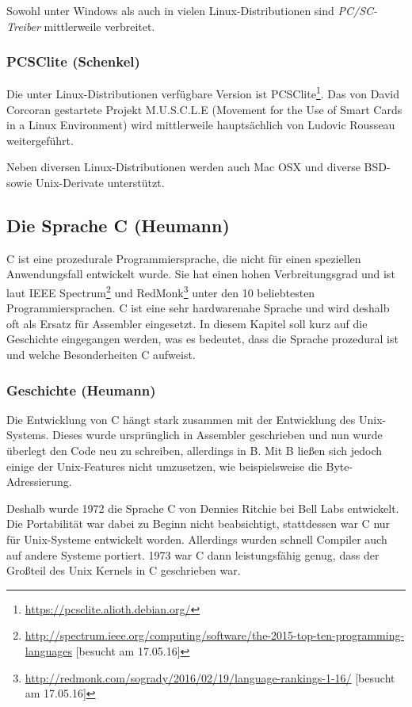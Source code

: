 Sowohl unter Windows als auch in vielen Linux-Distributionen sind
\textit{PC/SC-Treiber} mittlerweile verbreitet.

\subsubsection{PCSClite (Schenkel)}
Die unter Linux-Distributionen verfügbare Version ist
PCSClite\footnote{\url{https://pcsclite.alioth.debian.org/}}.
Das von David Corcoran gestartete Projekt M.U.S.C.L.E
(Movement for the Use of Smart Cards in a Linux Environment)
wird mittlerweile hauptsächlich von Ludovic Rousseau
weitergeführt\cite{pcscliteweb}.

Neben diversen Linux-Distributionen werden auch Mac OSX und diverse
BSD- sowie Unix-Derivate unterstützt.

\subsection{Die Sprache C (Heumann)}
 C ist eine prozedurale Programmiersprache, die nicht für einen speziellen
 Anwendungsfall entwickelt wurde. Sie hat einen hohen Verbreitungsgrad
 und ist laut \ac{IEEE} Spectrum\footnote{\url{http://spectrum.ieee.org/computing/software/the-2015-top-ten-programming-languages} [besucht am 17.05.16]}
 und RedMonk\footnote{\url{http://redmonk.com/sogrady/2016/02/19/language-rankings-1-16/} [besucht am 17.05.16]}
 unter den 10 beliebtesten Programmiersprachen. C ist eine sehr hardwarenahe
 Sprache und wird deshalb oft als Ersatz für Assembler eingesetzt. In
 diesem Kapitel soll kurz auf die Geschichte eingegangen werden, was es
 bedeutet, dass die Sprache prozedural ist und welche Besonderheiten C
 aufweist.

 \subsubsection{Geschichte (Heumann)}
  Die Entwicklung von C hängt stark zusammen mit der Entwicklung des Unix-Systems.
  Dieses wurde ursprünglich in Assembler geschrieben und nun wurde
  überlegt den Code neu zu schreiben, allerdings in B. Mit B ließen sich jedoch
  einige der Unix-Features nicht umzusetzen, wie beispielsweise die Byte-Adressierung.
  
  Deshalb wurde 1972 die Sprache C von Dennies Ritchie bei Bell Labs entwickelt. Die Portabilität war
  dabei zu Beginn nicht beabsichtigt, stattdessen war C nur für Unix-Systeme entwickelt
  worden. Allerdings wurden schnell Compiler auch auf andere Systeme portiert. 1973
  war C dann leistungsfähig genug, dass der Großteil des Unix Kernels in C geschrieben war.
  
